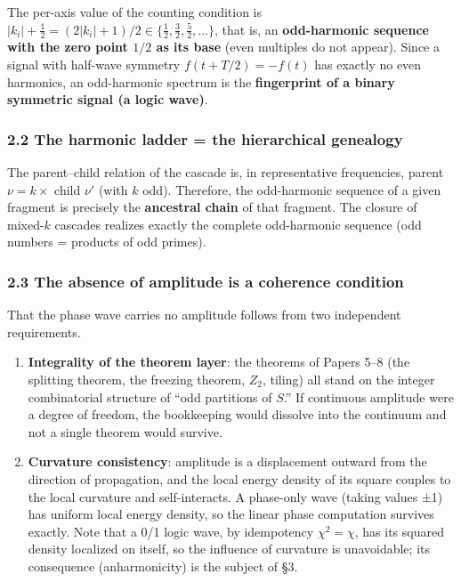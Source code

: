 \documentclass[
]{article}
\providecommand{\tightlist}{%
  \setlength{\itemsep}{0pt}\setlength{\parskip}{0pt}}
\begin{document}
The per-axis value of the counting condition is
\(|k_i|+\tfrac12=(2|k_i|+1)/2\in\{\tfrac12,\tfrac32,\tfrac52,\ldots\}\),
that is, an \textbf{odd-harmonic sequence with the zero point \(1/2\) as
its base} (even multiples do not appear). Since a signal with half-wave
symmetry \(f(t+T/2)=-f(t)\) has exactly no even harmonics, an
odd-harmonic spectrum is the \textbf{fingerprint of a binary symmetric
signal (a logic wave)}.

\subsubsection{2.2 The harmonic ladder = the hierarchical
genealogy}\label{the-harmonic-ladder-the-hierarchical-genealogy}

The parent--child relation of the cascade is, in representative
frequencies, parent \(\nu=k\times\) child \(\nu'\) (with \(k\) odd).
Therefore, the odd-harmonic sequence of a given fragment is precisely
the \textbf{ancestral chain} of that fragment. The closure of
mixed-\(k\) cascades realizes exactly the complete odd-harmonic sequence
(odd numbers = products of odd primes).

\subsubsection{2.3 The absence of amplitude is a coherence
condition}\label{the-absence-of-amplitude-is-a-coherence-condition}

That the phase wave carries no amplitude follows from two independent
requirements.

\begin{enumerate}
\def\labelenumi{\arabic{enumi}.}
\tightlist
\item
  \textbf{Integrality of the theorem layer}: the theorems of Papers 5--8
  (the splitting theorem, the freezing theorem, \(Z_2\), tiling) all
  stand on the integer combinatorial structure of ``odd partitions of
  \(S\).'' If continuous amplitude were a degree of freedom, the
  bookkeeping would dissolve into the continuum and not a single theorem
  would survive.
\item
  \textbf{Curvature consistency}: amplitude is a displacement outward
  from the direction of propagation, and the local energy density of its
  square couples to the local curvature and self-interacts. A phase-only
  wave (taking values ±1) has uniform local energy density, so the
  linear phase computation survives exactly. Note that a 0/1 logic wave,
  by idempotency \(\chi^2=\chi\), has its squared density localized on
  itself, so the influence of curvature is unavoidable; its consequence
  (anharmonicity) is the subject of §3.
\end{enumerate}
\end{document}
